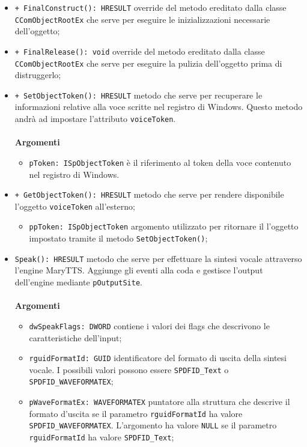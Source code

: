 	\begin{itemize}
		\item \texttt{+ FinalConstruct(): HRESULT} override del metodo ereditato dalla classe \texttt{CComObjectRootEx} che serve per eseguire le inizializzazioni necessarie dell'oggetto;
		\item \texttt{+ FinalRelease(): void} override del metodo ereditato dalla classe \texttt{CComObjectRootEx} che serve per eseguire la pulizia dell'oggetto prima di distruggerlo;
		\item \texttt{+ SetObjectToken(): HRESULT} metodo che serve per recuperare le informazioni relative alla voce scritte nel registro di Windows. Questo metodo andrà ad impostare l'attributo \texttt{voiceToken}.\\\\
		\textbf{Argomenti}
		\begin{itemize}
			\item \texttt{pToken: ISpObjectToken} è il riferimento al token della voce contenuto nel registro di Windows. 
		\end{itemize}
		\item \texttt{+ GetObjectToken(): HRESULT} metodo che serve per rendere disponibile l'oggetto \texttt{voiceToken} all'esterno;
		\begin{itemize}
			\item \texttt{ppToken: ISpObjectToken} argomento utilizzato per ritornare il l'oggetto impostato tramite il metodo \texttt{SetObjectToken()};
		\end{itemize}
		\item \texttt{Speak(): HRESULT} metodo che serve per effettuare la sintesi vocale attraverso l'engine MaryTTS. Aggiunge gli eventi alla coda e gestisce l'output dell'engine mediante \texttt{pOutputSite}.\\\\
		\textbf{Argomenti}
		\begin{itemize}
			\item \texttt{dwSpeakFlags: DWORD} contiene i valori dei flags che descrivono le caratteristiche dell'input;
			\item \texttt{rguidFormatId: GUID} identificatore del formato di uscita della sintesi vocale. I possibili valori possono essere \texttt{SPDFID\_Text} o \texttt{SPDFID\_WAVEFORMATEX};
			\item \texttt{pWaveFormatEx: WAVEFORMATEX} puntatore alla struttura che descrive il formato d'uscita se il parametro \texttt{rguidFormatId} ha valore \texttt{SPDFID\_WAVEFORMATEX}. L'argomento ha valore \texttt{NULL} se il parametro \texttt{rguidFormatId} ha valore \texttt{SPDFID\_Text};

\end{itemize}
\end{itemize}

